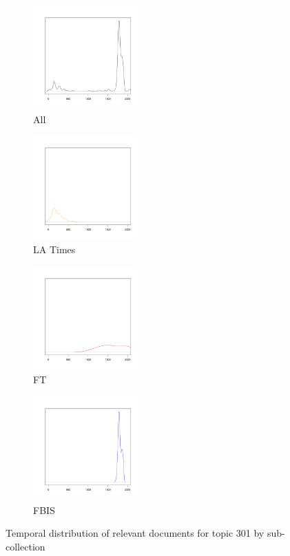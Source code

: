 \documentclass{sig-alternate}
\begin{document}
\begin{figure}
\begin{subfigure}[t]{4cm}
\includegraphics[width=4cm]{analysis/301/301-trec8.pdf}
\caption{All}
\end{subfigure}
\begin{subfigure}[t]{4cm}
\includegraphics[width=4cm]{analysis/301/301-la.pdf}
\caption{LA Times}
\end{subfigure}
\begin{subfigure}[t]{4cm}
\includegraphics[width=4cm]{analysis/301/301-ft.pdf}
\caption{FT}
\end{subfigure}
\begin{subfigure}[t]{4cm}
\includegraphics[width=4cm]{analysis/301/301-fbis.pdf}
\caption{FBIS}
\end{subfigure}
\caption{Temporal distribution of relevant documents for topic 301 by sub-collection} 
\label{fig.301}
\end{figure}
\end{document}
